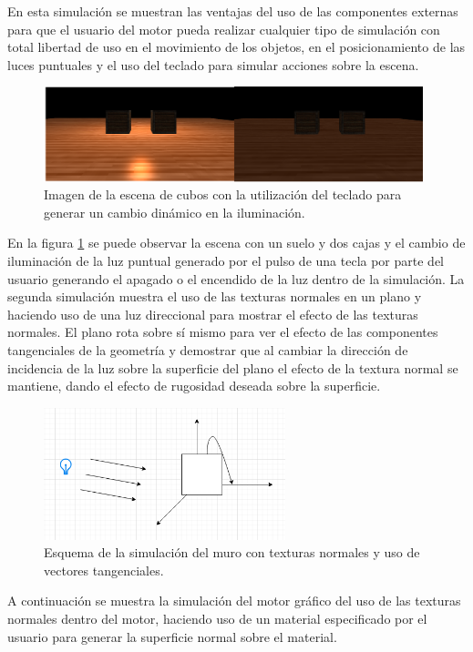\documentclass[a4paper]{book}
\begin{document}
En esta simulación se muestran las ventajas del uso de las componentes externas para que el usuario del motor pueda realizar
cualquier tipo de simulación con total libertad de uso en el movimiento de los objetos, en el posicionamiento de las luces
puntuales y el uso del teclado para simular acciones sobre la escena.

\begin{figure}[H]
    \centering
    \includegraphics[width=11cm, keepaspectratio]{img/CubeEvents.png}
    \caption{Imagen de la escena de cubos con la utilización del teclado para generar un cambio dinámico en la iluminación.}
    \label{CubeEvents}
\end{figure}

En la figura \ref{CubeEvents} se puede observar la escena con un suelo y dos cajas y el cambio de iluminación de la luz puntual generado por
el pulso de una tecla por parte del usuario generando el apagado o el encendido de la luz dentro de la simulación. La segunda simulación
muestra el uso de las texturas normales en un plano y haciendo uso de una luz direccional para mostrar el efecto de las texturas normales.
El plano rota sobre sí mismo para ver el efecto de las componentes tangenciales de la geometría y demostrar que al cambiar la dirección
de incidencia de la luz sobre la superficie del plano el efecto de la textura normal se mantiene, dando el efecto de rugosidad deseada
sobre la superficie.

\begin{figure}[H]
    \centering
    \includegraphics[width=7cm, keepaspectratio]{img/WallDiagram.png}
    \caption{Esquema de la simulación del muro con texturas normales y uso de vectores tangenciales.}
    \label{WallDiagram}
\end{figure}

A continuación se muestra la simulación del motor gráfico del uso de las texturas normales dentro del motor, haciendo uso de un
material especificado por el usuario para generar la superficie normal sobre el material.
\end{document}
